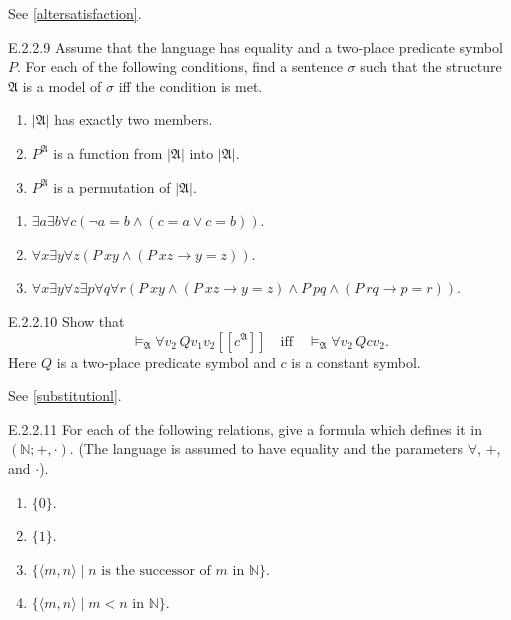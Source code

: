 See \ref{altersatisfaction}.

\setcounter{exercise}{8}

\begin{exercise}{E.2.2.9}
  Assume that the language has equality and a two-place predicate symbol $P$. For each of the following conditions, find a sentence $\sigma$ such that the structure $\mathfrak{A}$ is a model of $\sigma$ iff the condition is met.
  \begin{enumerate}
    \item $|\mathfrak{A}|$ has exactly two members.
    \item $P^{\mathfrak{A}}$ is a function from $|\mathfrak{A}|$ into $|\mathfrak{A}|$.
    \item $P^{\mathfrak{A}}$ is a permutation of $|\mathfrak{A}|$.\qedhere
  \end{enumerate}
\end{exercise}

\begin{enumerate}
  \item $\exists a\exists b\forall c(\neg a=b\wedge(c=a\vee c=b))$.
  \item $\forall x\exists y\forall z(P\ xy\wedge(P\ xz\to y=z))$.
  \item $\forall x\exists y\forall z\exists p\forall q\forall r(P\ xy\wedge(P\ xz\to y=z)\wedge P\ pq\wedge(P\ rq\to p=r))$.
\end{enumerate}

\begin{exercise}{E.2.2.10}
  Show that
  \[
    \models_{\mathfrak{A}} \forall v_2 \, Q v_1 v_2 [ [c^\mathfrak{A}] ] \quad \text{iff} \quad \models_{\mathfrak{A}} \forall v_2 \, Q c v_2.
  \]
  Here \( Q \) is a two-place predicate symbol and \( c \) is a constant symbol.
\end{exercise}

See \ref{substitutionl}.

\begin{exercise}{E.2.2.11}
  For each of the following relations, give a formula which defines it in \((\mathbb{N}; +, \cdot)\). (The language is assumed to have equality and the parameters \(\forall\), \(+\), and \(\cdot\)).
  \begin{enumerate}
    \item \(\{0\}\).
    \item \(\{1\}\).
    \item \(\{ \langle m, n \rangle \mid n \text{ is the successor of } m \text{ in } \mathbb{N} \}\).
    \item \(\{ \langle m, n \rangle \mid m < n \text{ in } \mathbb{N} \}\).\qedhere
  \end{enumerate}
\end{exercise}

